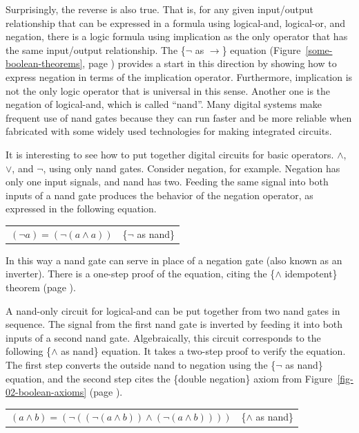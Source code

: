 Surprisingly, the reverse is also true.
That is, for any given input/output relationship that can be expressed
in a formula using logical-and, logical-or, and negation,
there is a logic formula using implication as
the only operator that has the same input/output relationship.
The \{$\neg$ as $\rightarrow$\} equation
(Figure~\ref{some-boolean-theorems}, page \pageref{some-boolean-theorems})
provides a start in this direction by showing how to express
negation in terms of the implication operator.
Furthermore, implication is not the only logic operator
that is universal in this sense.
Another one
is the negation of logical-and, which is called ``nand''.
Many digital systems make frequent use of
nand gates because they can run faster and be more reliable
when fabricated with some widely used technologies
for making integrated circuits.

It is interesting to see how to put together digital
circuits for basic operators.
$\wedge$, $\vee$, and $\neg$, using only nand gates.
Consider negation, for example.
Negation has only one input signals, and nand has two.
Feeding the same signal into both
inputs of a nand gate produces the behavior of
the negation operator,
as expressed in the following equation.

\begin{center}
\begin{tabular}{ll}
$(\neg a) = (\neg (a \wedge a))$  & \{$\neg$ as nand\}\label{neg-as-nand}
\end{tabular}
\end{center}

In this way a nand gate can serve in place of a
negation gate (also known as an inverter).
There is a one-step proof of the equation,
citing the \{$\wedge$ idempotent\} theorem
(page \pageref{and-idempotent}).

A nand-only circuit for logical-and can be
put together from two nand gates in sequence.
The signal from the first nand gate is inverted
by feeding it into both inputs of a second nand gate.
Algebraically, this circuit corresponds to the following \{$\wedge$ as nand\} equation.
It takes a two-step proof to verify the equation.
The first step converts the outside nand to negation using the
\{$\neg$ as nand\} equation, and the second step cites
the \{double negation\} axiom from Figure~\ref{fig-02-boolean-axioms}
(page \pageref{fig-02-boolean-axioms}).

\begin{center}
\begin{tabular}{ll}
$(a \wedge b) = (\neg ((\neg (a \wedge b)) \wedge (\neg (a \wedge b))))$ & \{$\wedge$ as nand\}\label{and-as-nand}
\end{tabular}
\end{center}

